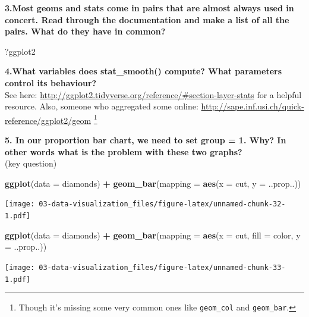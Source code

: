 \documentclass[]{book}
\newenvironment{Shaded}{\begin{snugshade}}{\end{snugshade}}
\newcommand{\DataTypeTok}[1]{\textcolor[rgb]{0.13,0.29,0.53}{#1}}
\newcommand{\KeywordTok}[1]{\textcolor[rgb]{0.13,0.29,0.53}{\textbf{#1}}}
\newcommand{\NormalTok}[1]{#1}
\newcommand{\OperatorTok}[1]{\textcolor[rgb]{0.81,0.36,0.00}{\textbf{#1}}}
\newcommand{\StringTok}[1]{\textcolor[rgb]{0.31,0.60,0.02}{#1}}
\let\rmarkdownfootnote\footnote%
\def\footnote{\protect\rmarkdownfootnote}
\theoremstyle{definition}
\theoremstyle{definition}
\theoremstyle{definition}
\theoremstyle{remark}
\begin{document}
\textbf{3.Most geoms and stats come in pairs that are almost always used
in concert. Read through the documentation and make a list of all the
pairs. What do they have in common?}

\begin{Shaded}
\begin{Highlighting}[]
\NormalTok{?ggplot2}
\end{Highlighting}
\end{Shaded}

\textbf{4.What variables does stat\_smooth() compute? What parameters
control its behaviour?}\\
See here:
\url{http://ggplot2.tidyverse.org/reference/\#section-layer-stats} for a
helpful resource. Also, someone who aggregated some online:
\url{http://sape.inf.usi.ch/quick-reference/ggplot2/geom} \footnote{Though
  it's missing some very common ones like \texttt{geom\_col} and
  \texttt{geom\_bar}.}

\textbf{5. In our proportion bar chart, we need to set group = 1. Why?
In other words what is the problem with these two graphs?}\\
(key question)

\begin{Shaded}
\begin{Highlighting}[]
\KeywordTok{ggplot}\NormalTok{(}\DataTypeTok{data =}\NormalTok{ diamonds) }\OperatorTok{+}\StringTok{ }
\StringTok{  }\KeywordTok{geom_bar}\NormalTok{(}\DataTypeTok{mapping =} \KeywordTok{aes}\NormalTok{(}\DataTypeTok{x =}\NormalTok{ cut, }\DataTypeTok{y =}\NormalTok{ ..prop..))}
\end{Highlighting}
\end{Shaded}

\texttt{[image: 03-data-visualization\_files/figure-latex/unnamed-chunk-32-1.pdf]}

\begin{Shaded}
\begin{Highlighting}[]
\KeywordTok{ggplot}\NormalTok{(}\DataTypeTok{data =}\NormalTok{ diamonds) }\OperatorTok{+}\StringTok{ }
\StringTok{  }\KeywordTok{geom_bar}\NormalTok{(}\DataTypeTok{mapping =} \KeywordTok{aes}\NormalTok{(}\DataTypeTok{x =}\NormalTok{ cut, }\DataTypeTok{fill =}\NormalTok{ color, }\DataTypeTok{y =}\NormalTok{ ..prop..))}
\end{Highlighting}
\end{Shaded}

\texttt{[image: 03-data-visualization\_files/figure-latex/unnamed-chunk-33-1.pdf]}
\end{document}
